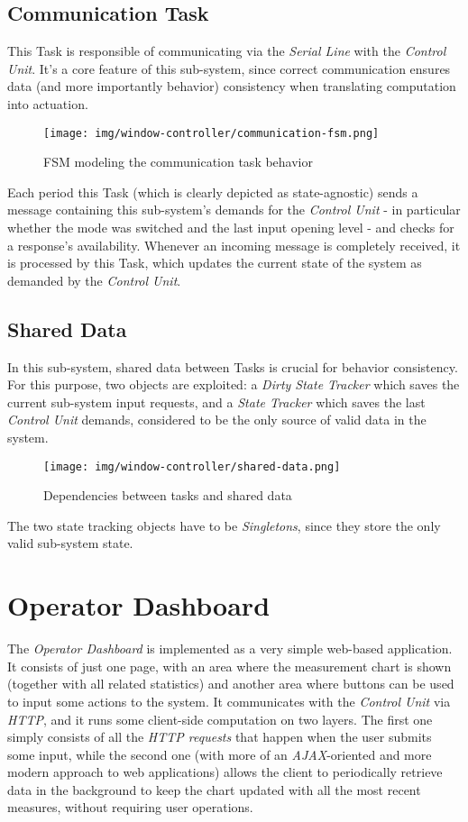 \documentclass[a4paper,12pt]{report}
\begin{document}
		\subsection{Communication Task}
		This Task is responsible of communicating via the \textit{Serial Line} with the \textit{Control Unit}. It's a core feature of this sub-system, since correct communication ensures data (and more importantly behavior) consistency when translating computation into actuation.
		\begin{figure}[H]
			\centering{}
			\texttt{[image: img/window-controller/communication-fsm.png]}
			\caption{FSM modeling the communication task behavior}
			\label{img:window-controller/communication-fsm}
		\end{figure}
		Each period this Task (which is clearly depicted as state-agnostic) sends a message containing this sub-system's demands for the \textit{Control Unit} - in particular whether the mode was switched and the last input opening level - and checks for a response's availability. Whenever an incoming message is completely received, it is processed by this Task, which updates the current state of the system as demanded by the \textit{Control Unit}.
		\subsection{Shared Data}
		In this sub-system, shared data between Tasks is crucial for behavior consistency. For this purpose, two objects are exploited: a \textit{Dirty State Tracker} which saves the current sub-system input requests, and a \textit{State Tracker} which saves the last \textit{Control Unit} demands, considered to be the only source of valid data in the system.
		\begin{figure}[H]
			\centering{}
			\texttt{[image: img/window-controller/shared-data.png]}
			\caption{Dependencies between tasks and shared data}
			\label{img:window-controller/shared-data}
		\end{figure}
		The two state tracking objects have to be \textit{Singletons}, since they store the only valid sub-system state.
	\section{Operator Dashboard}
	The \textit{Operator Dashboard} is implemented as a very simple web-based application. It consists of just one page, with an area where the measurement chart is shown (together with all related statistics) and another area where buttons can be used to input some actions to the system.
	\newline It communicates with the \textit{Control Unit} via \textit{HTTP}, and it runs some client-side computation on two layers. The first one simply consists of all the \textit{HTTP requests} that happen when the user submits some input, while the second one (with more of an \textit{AJAX}-oriented and more modern approach to web applications) allows the client to periodically retrieve data in the background to keep the chart updated with all the most recent measures, without requiring user operations.
\end{document}
